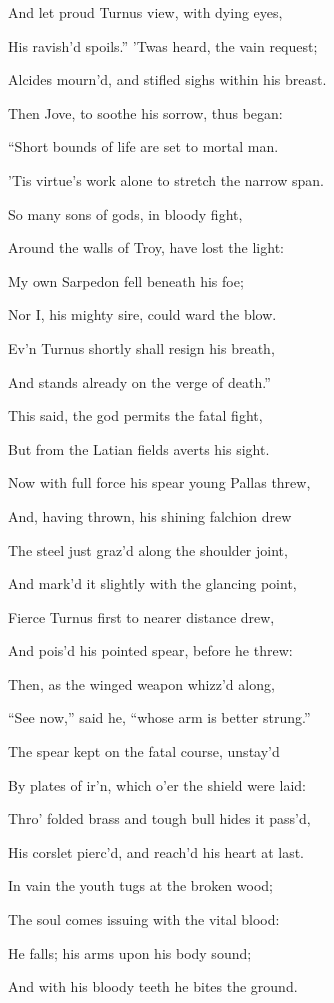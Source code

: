 And let proud Turnus view, with dying eyes,

His ravish’d spoils.” ’Twas heard, the vain request;

Alcides mourn’d, and stifled sighs within his breast.

Then Jove, to soothe his sorrow, thus began:

“Short bounds of life are set to mortal man.

’Tis virtue’s work alone to stretch the narrow span.

So many sons of gods, in bloody fight,

Around the walls of Troy, have lost the light:

My own Sarpedon fell beneath his foe;

Nor I, his mighty sire, could ward the blow.

Ev’n Turnus shortly shall resign his breath,

And stands already on the verge of death.”

This said, the god permits the fatal fight,

But from the Latian fields averts his sight.

Now with full force his spear young Pallas threw,

And, having thrown, his shining falchion drew

The steel just graz’d along the shoulder joint,

And mark’d it slightly with the glancing point,

Fierce Turnus first to nearer distance drew,

And pois’d his pointed spear, before he threw:

Then, as the winged weapon whizz’d along,

“See now,” said he, “whose arm is better strung.”

The spear kept on the fatal course, unstay’d

By plates of ir’n, which o’er the shield were laid:

Thro’ folded brass and tough bull hides it pass’d,

His corslet pierc’d, and reach’d his heart at last.

In vain the youth tugs at the broken wood;

The soul comes issuing with the vital blood:

He falls; his arms upon his body sound;

And with his bloody teeth he bites the ground.

